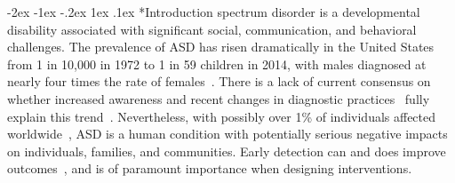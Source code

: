 \documentclass[onecolumn,,10pt]{IEEEtran}
\makeatletter
\renewcommand\section{\@startsection {section}{1}{\z@}%
  {-2ex \@plus -1ex \@minus -.2ex}%
  {1ex \@plus.1ex}%
  {\Large\bfseries\scshape}}
\makeatother
\begin{document}
  \section*{Introduction}
   spectrum disorder is a developmental disability associated with significant social, communication, and behavioral challenges.
 The prevalence of ASD  has risen dramatically in the United States from 1 in 10,000 in
 1972 to 1 in 59 children in 2014, with males  diagnosed at nearly four times the rate of females~\cite{pmid29701730,cdc}.
There is a lack of  current consensus on whether increased awareness and recent changes in diagnostic practices~\cite{hyman2020identification} fully explain this  trend~\cite{pmid19737791}.
%
Nevertheless, with   possibly  over 1\% of individuals affected worldwide~\cite{pmid22495912},  ASD is  a human condition with potentially serious negative impacts on individuals, families, and communities. 
Early detection can and does improve outcomes~\cite{hyman2020identification}, and is of paramount importance when designing interventions.
\end{document}
